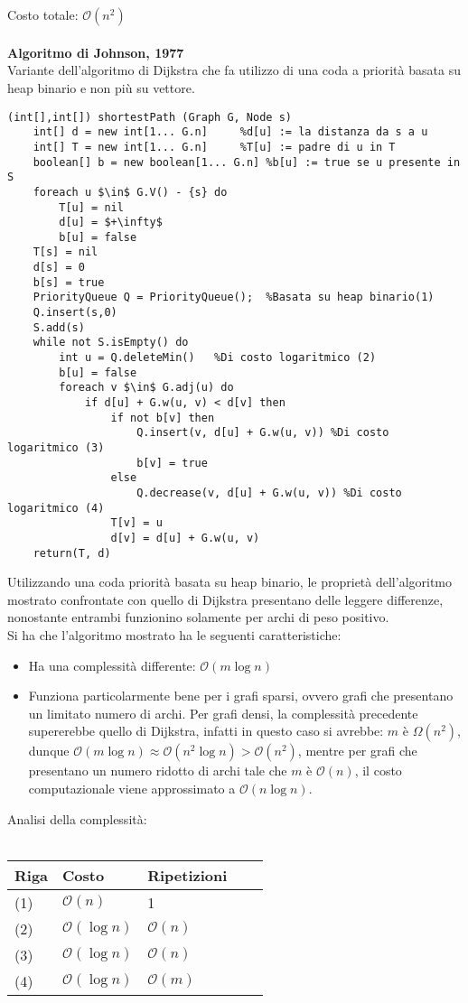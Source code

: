 \documentclass[../cheatSheetAlgoritmi.tex]{subfiles}
\begin{document}
\\\\
Costo totale: $\mathcal{O}(n^2)$ \\\\
\textbf{Algoritmo di Johnson, 1977} \\
Variante dell'algoritmo di Dijkstra che fa utilizzo di una coda a priorità  basata su heap binario e non più su vettore.
\begin{lstlisting}[caption=Algoritmo di Johnson: cammini minimi a sorgente singola]
(int[],int[]) shortestPath (Graph G, Node s)
	int[] d = new int[1... G.n]		%d[u] := la distanza da s a u 
	int[] T = new int[1... G.n]		%T[u] := padre di u in T
	boolean[] b = new boolean[1... G.n]	%b[u] := true se u presente in S 
	foreach u $\in$ G.V() - {s} do
		T[u] = nil
		d[u] = $+\infty$
		b[u] = false
	T[s] = nil
	d[s] = 0
	b[s] = true
	PriorityQueue Q = PriorityQueue();	%Basata su heap binario(1)
	Q.insert(s,0)
	S.add(s)
	while not S.isEmpty() do 
		int u = Q.deleteMin()	%Di costo logaritmico (2)
		b[u] = false
		foreach v $\in$ G.adj(u) do
			if d[u] + G.w(u, v) < d[v] then 
				if not b[v] then
					Q.insert(v, d[u] + G.w(u, v)) %Di costo logaritmico (3)
					b[v] = true
				else
					Q.decrease(v, d[u] + G.w(u, v)) %Di costo logaritmico (4)
				T[v] = u 
				d[v] = d[u] + G.w(u, v)
	return(T, d)
\end{lstlisting}
Utilizzando una coda priorità basata su heap binario, le proprietà dell'algoritmo mostrato confrontate con quello di Dijkstra presentano delle leggere differenze, nonostante entrambi funzionino solamente per archi di peso positivo. \\
Si ha che l'algoritmo mostrato ha le seguenti caratteristiche:
\begin{itemize}
	\item Ha una complessità differente: $\mathcal{O}(m \log n)$
	\item Funziona particolarmente bene per i grafi sparsi, ovvero grafi che presentano un limitato numero di archi.
	Per grafi densi, la complessità precedente supererebbe quello di Dijkstra, infatti in questo caso si avrebbe: $m$ è $\Omega(n^2)$, dunque $\mathcal{O}(m \log n) 	\approx \mathcal{O}(n^2 \log n) >  \mathcal{O}(n^2)$, mentre per grafi che presentano un numero ridotto di archi tale che $m$ è $\mathcal{O}(n)$, il costo computazionale viene approssimato a $\mathcal{O}(n \log n)$.
\end{itemize}
Analisi della complessità:
\\\\
\begin{tabular}{@{}lllll@{}}
\toprule
Riga & Costo & Ripetizioni &  &  \\ \midrule
(1) & $\mathcal{O}(n)$     & 1           &  &  \\
(2)    & $\mathcal{O}(\log n)$     & $\mathcal{O}(n)$           &  &  \\
(3)    & $\mathcal{O}(\log n)$     & $\mathcal{O}(n)$           &  &  \\
(4)    & $\mathcal{O}(\log n)$     & $\mathcal{O}(m)$           &  &  \\ \bottomrule
\end{tabular}
\end{document}
